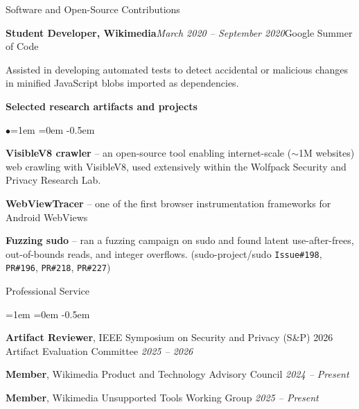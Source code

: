 \documentclass{resume} %
\begin{document}
\begin{rSection}{Software and Open-Source Contributions}
\begin{rSubsection}{\bf Student Developer, Wikimedia}{\em March 2020 -- September 2020}{Google Summer of Code}{}
\item Assisted in developing automated tests to detect accidental or malicious changes in minified JavaScript blobs imported as dependencies.
\end{rSubsection}
\vspace{-0.3em}
{\bf Selected research artifacts and projects}
\begin{list}{$\bullet$}{\leftmargin=1em \itemindent=0em}
\itemsep -0.5em
\item {\bf VisibleV8 crawler} -- an open-source tool enabling internet-scale ($\sim$1M websites) web crawling with VisibleV8, used extensively within the Wolfpack Security and Privacy Research Lab.
\item {\bf WebViewTracer} -- one of the first browser instrumentation frameworks for Android WebViews
\item {\bf Fuzzing sudo} -- ran a fuzzing campaign on sudo and found latent use-after-frees, out-of-bounds reads, and integer overflows. (sudo-project/sudo \texttt{Issue\#198}, \texttt{PR\#196}, \texttt{PR\#218}, \texttt{PR\#227})
\end{list}
\end{rSection}
\begin{rSection}{Professional Service}
\begin{list}{}{\leftmargin=1em \itemindent=0em}
\itemsep -0.5em 
\item {\bf Artifact Reviewer}, IEEE Symposium on Security and Privacy (S\&P) 2026 Artifact Evaluation Committee \hfill {\em 2025 -- 2026}
\item {\bf Member}, Wikimedia Product and Technology Advisory Council \hfill {\em 2024 -- Present}
\item {\bf Member}, Wikimedia Unsupported Tools Working Group \hfill {\em 2025 -- Present}
\end{list}
\end{rSection}
\end{document}
